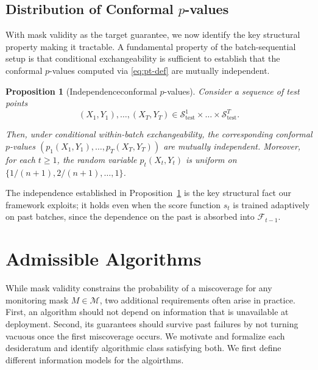 \documentclass{uai2026} %
\newtheorem{proposition}[theorem]{Proposition}
\newcommand{\1}{\mathbf{1}}
\newcommand{\test}{\mathrm{test}}
\newcommand{\scal}{\mathcal{S}}
\newcommand{\F}{\mathcal{F}}
\newcommand{\mcal}{\mathcal{M}}
\newcommand{\scaltest}{\scal_{\test}}
\begin{document}
\subsection{Distribution of Conformal \texorpdfstring{$p$}{p}-values}
\label{sec:distribution-pvalues}

With mask validity as the target guarantee, we now identify the key structural property making it tractable. A fundamental property of the batch-sequential setup is that conditional exchangeability is sufficient to establish that the conformal $p$-values computed via \eqref{eq:pt-def} are mutually independent.

\begin{proposition}[Independenceconformal $p$-values]
  \label{prop:iid-pvalues} Consider a sequence of test points $$(X_1,Y_1), \ldots, (X_T,Y_T) \in  \scaltest^1\times \ldots\times \scaltest^T.$$

  Then, under conditional within-batch exchangeability, the corresponding conformal $p$-values $(p_1(X_1,Y_1), \ldots, p_T(X_T, Y_T))$ are mutually independent.
  Moreover, for each $t\ge 1$, the random variable $p_t(X_t, Y_t)$ is uniform on $\{1/(n+1),2/(n+1),\ldots,1\}$.
\end{proposition}

The independence established in Proposition~\ref{prop:iid-pvalues} is the key structural fact our framework exploits; it holds even when the score function $s_t$ is trained adaptively on past batches, since the dependence on the past is absorbed into $\F_{t-1}$.



\section{Admissible Algorithms}
\label{sec:admissible}
\label{sec:beyond}

While mask validity constrains the probability of a miscoverage for any monitoring mask $M\in\mcal$, two additional requirements often arise in practice.
First, an algorithm should not depend on information that is unavailable at deployment.
Second, its guarantees should survive past failures by not turning vacuous once the first miscoverage occurs. We motivate and formalize each desideratum and identify algorithmic class satisfying both. We first define different information models for the algoirthms.
\end{document}
